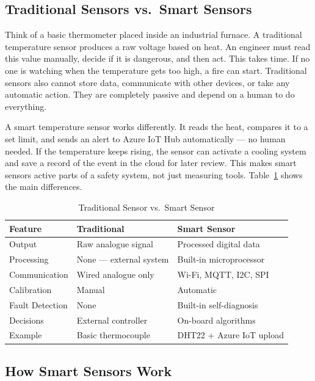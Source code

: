 \documentclass[conference]{IEEEtran}
\begin{document}
\subsection{Traditional Sensors vs.\ Smart Sensors}

Think of a basic thermometer placed inside an industrial furnace. A traditional temperature sensor produces a raw voltage based on heat. An engineer must read this value manually, decide if it is dangerous, and then act. This takes time. If no one is watching when the temperature gets too high, a fire can start. Traditional sensors also cannot store data, communicate with other devices, or take any automatic action. They are completely passive and depend on a human to do everything.

A smart temperature sensor works differently. It reads the heat, compares it to a set limit, and sends an alert to Azure IoT Hub automatically — no human needed. If the temperature keeps rising, the sensor can activate a cooling system and save a record of the event in the cloud for later review. This makes smart sensors active parts of a safety system, not just measuring tools. Table~\ref{tab:sensor_compare} shows the main differences.

\begin{table}[htbp]
\caption{Traditional Sensor vs.\ Smart Sensor}
\label{tab:sensor_compare}
\centering
\begin{tabular}{|l|l|l|}
\hline
\textbf{Feature} & \textbf{Traditional} & \textbf{Smart Sensor} \\
\hline
Output & Raw analogue signal & Processed digital data \\
Processing & None — external system & Built-in microprocessor \\
Communication & Wired analogue only & Wi-Fi, MQTT, I2C, SPI \\
Calibration & Manual & Automatic \\
Fault Detection & None & Built-in self-diagnosis \\
Decisions & External controller & On-board algorithms \\
Example & Basic thermocouple & DHT22 + Azure IoT upload \\
\hline
\end{tabular}
\end{table}

\subsection{How Smart Sensors Work}
\end{document}

